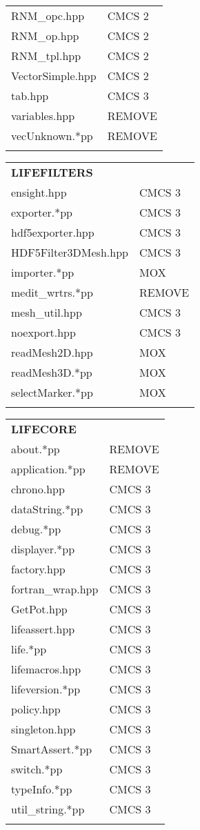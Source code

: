 \documentclass[10p]{article}
\theoremstyle{definition}
\begin{document}
\begin{landscape}
\begin{table}[!h]
\begin{multicols}{4}
\begin{xtabular}{
p{0.20\textwidth}<{}|
p{0.10\textwidth}<{}
}
RNM\_opc.hpp & CMCS 2\\
RNM\_op.hpp & CMCS 2\\
RNM\_tpl.hpp & CMCS 2\\
VectorSimple.hpp & CMCS 2\\
tab.hpp & CMCS 3\\
variables.hpp & REMOVE\\
vecUnknown.*pp & REMOVE\\
& \\
\end{xtabular}
\begin{xtabular}{
p{0.20\textwidth}<{}|
p{0.1\textwidth}<{}
}
\textbf{LIFEFILTERS} \\
ensight.hpp & CMCS 3\\
exporter.*pp & CMCS 3\\
hdf5exporter.hpp & CMCS 3\\
HDF5Filter3DMesh.hpp & CMCS 3\\
importer.*pp & MOX\\
medit\_wrtrs.*pp & REMOVE\\
mesh\_util.hpp & CMCS 3\\
noexport.hpp & CMCS 3\\
readMesh2D.hpp & MOX\\
readMesh3D.*pp & MOX\\
selectMarker.*pp & MOX\\
& \\
\end{xtabular}
\begin{xtabular}{
p{0.18\textwidth}<{}|
p{0.1\textwidth}<{}
}
\textbf{LIFECORE} \\
about.*pp & REMOVE\\
application.*pp & REMOVE\\
chrono.hpp & CMCS 3\\
dataString.*pp & CMCS 3\\
debug.*pp & CMCS 3\\
displayer.*pp & CMCS 3\\
factory.hpp & CMCS 3\\
fortran\_wrap.hpp & CMCS 3\\
GetPot.hpp & CMCS 3\\
lifeassert.hpp & CMCS 3\\
life.*pp & CMCS 3\\
lifemacros.hpp & CMCS 3\\
lifeversion.*pp & CMCS 3\\
policy.hpp & CMCS 3\\
singleton.hpp & CMCS 3\\
SmartAssert.*pp & CMCS 3\\
switch.*pp & CMCS 3\\
typeInfo.*pp & CMCS 3\\
util\_string.*pp & CMCS 3\\
& \\
\end{xtabular}


\end{multicols}
\end{table}
\end{landscape}
\end{document}
